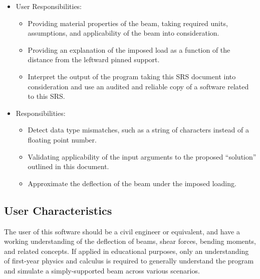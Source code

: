 \documentclass[12pt]{article}
\begin{document}
\begin{itemize}
    \item User Responsibilities:
          \begin{itemize}

              \item Providing material properties of the beam, taking required
                    units, assumptions, and applicability of the beam into
                    consideration.

              \item Providing an explanation of the imposed load as a function
                    of the distance from the leftward pinned support.

              \item Interpret the output of the program taking this SRS document
                    into consideration and use an audited and reliable copy of a
                    software related to this SRS.

          \end{itemize}

    \item \progname{} Responsibilities:
          \begin{itemize}

              \item Detect data type mismatches, such as a string of characters
                    instead of a floating point number.

              \item Validating applicability of the input arguments to the
                    proposed ``solution'' outlined in this document.

              \item Approximate the deflection of the beam under the imposed
                    loading.

          \end{itemize}
\end{itemize}

\subsection{User Characteristics}
\label{SecUserCharacteristics}

The user of this software should be a civil engineer or equivalent, and have a
working understanding of the deflection of beams, shear forces, bending moments,
and related concepts. If applied in educational purposes, only an understanding
of first-year physics and calculus is required to generally understand the
program and simulate a simply-supported beam across various scenarios.
\end{document}

